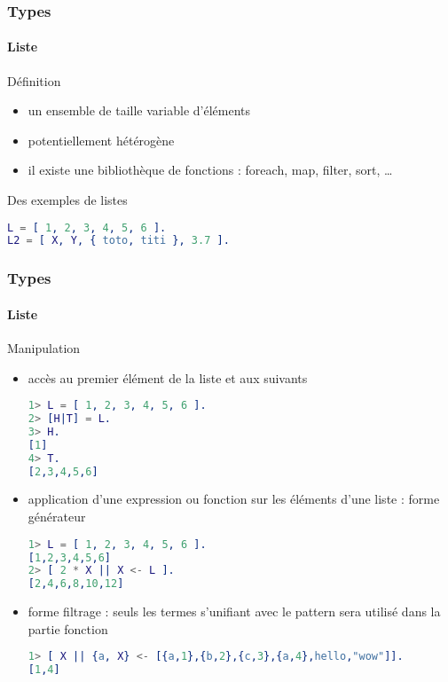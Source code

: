 \begin{frame}[fragile]
  \frametitle{Types}
  \framesubtitle{Liste}

  \begin{block}{Définition}
    \begin{itemize}
      \item un ensemble de taille variable d'éléments
      \item potentiellement hétérogène
      \item il existe une bibliothèque de fonctions : foreach, map, filter,
        sort, \ldots
    \end{itemize}
  \end{block}

  \begin{exampleblock}{Des exemples de listes}
    \begin{lstlisting}[language=erlang]
L = [ 1, 2, 3, 4, 5, 6 ].
L2 = [ X, Y, { toto, titi }, 3.7 ].
    \end{lstlisting}
  \end{exampleblock}

\end{frame}

\begin{frame}[fragile]
  \frametitle{Types}
  \framesubtitle{Liste}

  \begin{block}{Manipulation}
    \begin{itemize}
    \item accès au premier élément de la liste et aux suivants
      \begin{lstlisting}[language=erlang]
1> L = [ 1, 2, 3, 4, 5, 6 ].
2> [H|T] = L.
3> H.
[1]
4> T.
[2,3,4,5,6]
      \end{lstlisting}
    \item application d'une expression ou fonction sur les éléments d'une
      liste : forme générateur
      \begin{lstlisting}[language=erlang]
1> L = [ 1, 2, 3, 4, 5, 6 ].
[1,2,3,4,5,6]
2> [ 2 * X || X <- L ].
[2,4,6,8,10,12]
      \end{lstlisting}
    \item forme filtrage : seuls les termes s'unifiant avec le pattern sera
      utilisé dans la partie fonction
      \begin{lstlisting}[language=erlang]
1> [ X || {a, X} <- [{a,1},{b,2},{c,3},{a,4},hello,"wow"]].
[1,4]
      \end{lstlisting}
    \end{itemize}
  \end{block}

\end{frame}


